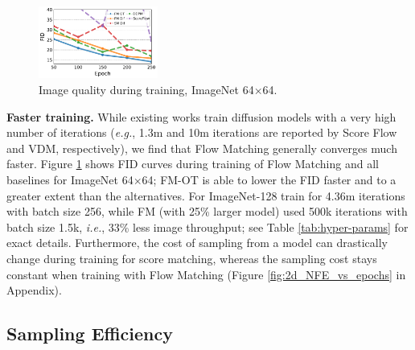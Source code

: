 \documentclass{article}
\makeatletter
\renewcommand*{\eg}{{\it e.g.}\@\xspace}
\renewcommand*{\ie}{{\it i.e.}\@\xspace}
\makeatother
\begin{document}
\begin{figure}
\vspace{-19pt}
  \begin{center}
  \includegraphics[width=0.35\textwidth]{figures/imagenet64/fid_vs_epoch_imagenet64.pdf} 
  \end{center}\vspace{-14pt}
  \caption{{Image quality during training, ImageNet 64$\times$64.}} \label{fig:FID_vs_epochs}
\end{figure}
\textbf{Faster training.} 
While existing works train diffusion models with a very high number of iterations (\eg, 1.3m and 10m iterations are reported by Score Flow and VDM, respectively), we  find that Flow Matching generally converges much faster. 
%
{Figure \ref{fig:FID_vs_epochs} shows FID curves during training of Flow Matching and all baselines for ImageNet 64$\times$64; FM-OT is able to lower the FID faster and to a greater extent than the alternatives. } 
% 
% 
% 
For ImageNet-128 \cite{dhariwal2021diffusion} train for 4.36m iterations with batch size 256, while FM (with 25\% larger model) used 500k iterations with batch size 1.5k, \ie, 33\% less image throughput; see Table \ref{tab:hyper-params} for exact details. 
%
Furthermore, the cost of sampling from a model can drastically change during training for score matching, whereas the sampling cost stays constant when training with Flow Matching (Figure \ref{fig:2d_NFE_vs_epochs} in Appendix). \vspace{-5pt}

\subsection{Sampling Efficiency}\vspace{-5pt}
\end{document}
